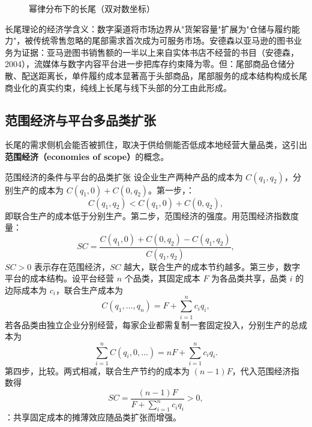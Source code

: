 \begin{figure}[htbp]
\centering
{}
\caption{幂律分布下的长尾（双对数坐标）}
\label{fig:longtail}
\end{figure}

长尾理论的经济学含义：数字渠道将市场边界从"货架容量"扩展为"仓储与履约能力"，被传统零售忽略的尾部需求首次成为可服务市场。安德森以亚马逊的图书业务为证据：亚马逊图书销售额的一半以上来自实体书店不经营的书目（安德森，2004），流媒体与数字内容平台进一步把库存约束降为零。但：尾部商品仓储分散、配送距离长，单件履约成本显著高于头部商品，尾部服务的成本结构构成长尾商业化的真实约束，纯线上长尾与线下头部的分工由此形成。

\subsection{范围经济与平台多品类扩张}

长尾的需求侧机会能否被抓住，取决于供给侧能否低成本地经营大量品类，这引出\textbf{范围经济（economies of scope）}的概念。

\begin{derivation}{范围经济的条件与平台的品类扩张}{}
设企业生产两种产品的成本为 $C(q_1, q_2)$，分别生产的成本为 $C(q_1, 0) + C(0, q_2)$。第一步，：
\[
C(q_1, q_2) < C(q_1, 0) + C(0, q_2),
\]
即联合生产的成本低于分别生产。第二步，范围经济的强度。用范围经济指数度量：
\[
SC = \frac{C(q_1, 0) + C(0, q_2) - C(q_1, q_2)}{C(q_1, q_2)},
\]
$SC > 0$ 表示存在范围经济，$SC$ 越大，联合生产的成本节约越多。第三步，数字平台的成本结构。设平台经营 $n$ 个品类，其固定成本 $F$ 为各品类共享，品类 $i$ 的边际成本为 $c_i$，联合生产成本为
\[
C(q_1, \dots, q_n) = F + \sum_{i=1}^{n} c_i q_i,
\]
若各品类由独立企业分别经营，每家企业都需复制一套固定投入，分别生产的总成本为
\[
\sum_{i=1}^{n} C(q_i, 0, \dots) = nF + \sum_{i=1}^{n} c_i q_i.
\]
第四步，比较。两式相减，联合生产节约的成本为 $(n-1)F$，代入范围经济指数得
\[
SC = \frac{(n-1)F}{F + \sum_{i=1}^{n} c_i q_i} > 0,
\]
：共享固定成本的摊薄效应随品类扩张而增强。
\end{derivation}


